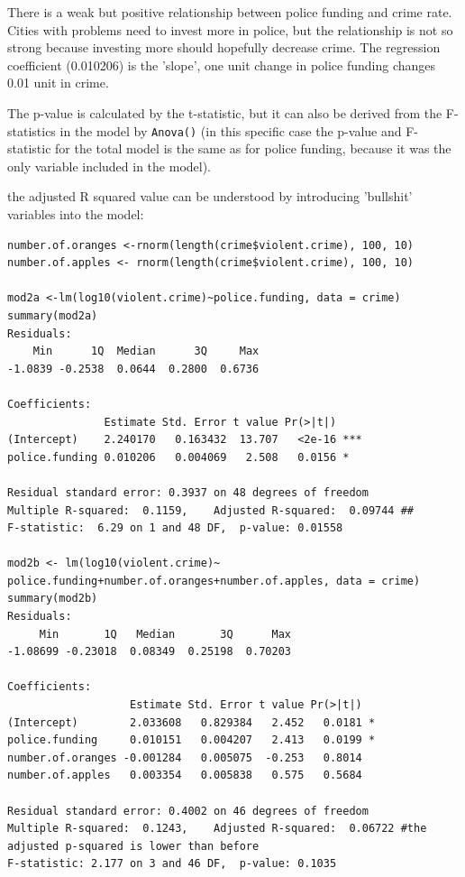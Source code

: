 \documentclass{article}
\begin{document}
There is a weak but positive relationship between police funding and crime rate. Cities with problems need to invest more in police, but the relationship is not so strong because investing more should hopefully decrease crime. The regression coefficient (0.010206) is the 'slope', one unit change in police funding changes 0.01 unit in crime. \par 
The p-value is calculated by the t-statistic, but it can also be derived from the F-statistics in the model by \texttt{Anova()} (in this specific case the p-value and F-statistic for the total model is the same as for police funding, because it was the only variable included in the model).\par 
the adjusted R squared value can be understood by introducing 'bullshit' variables into the model:

\begin{lstlisting}
number.of.oranges <-rnorm(length(crime$violent.crime), 100, 10)
number.of.apples <- rnorm(length(crime$violent.crime), 100, 10)

mod2a <-lm(log10(violent.crime)~police.funding, data = crime)
summary(mod2a)
Residuals:
    Min      1Q  Median      3Q     Max 
-1.0839 -0.2538  0.0644  0.2800  0.6736 

Coefficients:
               Estimate Std. Error t value Pr(>|t|)    
(Intercept)    2.240170   0.163432  13.707   <2e-16 ***
police.funding 0.010206   0.004069   2.508   0.0156 *  

Residual standard error: 0.3937 on 48 degrees of freedom
Multiple R-squared:  0.1159,	Adjusted R-squared:  0.09744 ##
F-statistic:  6.29 on 1 and 48 DF,  p-value: 0.01558

mod2b <- lm(log10(violent.crime)~ police.funding+number.of.oranges+number.of.apples, data = crime)
summary(mod2b)
Residuals:
     Min       1Q   Median       3Q      Max 
-1.08699 -0.23018  0.08349  0.25198  0.70203 

Coefficients:
                   Estimate Std. Error t value Pr(>|t|)  
(Intercept)        2.033608   0.829384   2.452   0.0181 *
police.funding     0.010151   0.004207   2.413   0.0199 *
number.of.oranges -0.001284   0.005075  -0.253   0.8014  
number.of.apples   0.003354   0.005838   0.575   0.5684  

Residual standard error: 0.4002 on 46 degrees of freedom
Multiple R-squared:  0.1243,	Adjusted R-squared:  0.06722 #the adjusted p-squared is lower than before
F-statistic: 2.177 on 3 and 46 DF,  p-value: 0.1035 
\end{lstlisting}
\end{document}
